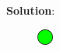 \documentclass[11pt]{article}
\newcommand{\solution}{{\bf Solution}:\\}
\begin{document}
\solution
\begin{figure}[h]
\centering
\includegraphics{draggable.green.dot.png}
\end{figure}
\end{document}
